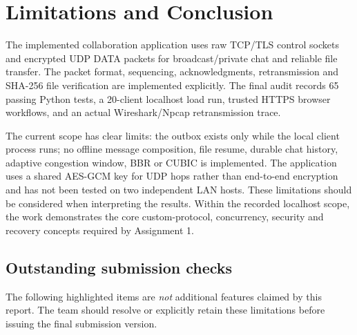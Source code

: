 \section{Limitations and Conclusion}

The implemented collaboration application uses raw TCP/TLS control sockets and encrypted UDP DATA packets for broadcast/private chat and reliable file transfer. The packet format, sequencing, acknowledgments, retransmission and SHA-256 file verification are implemented explicitly. The final audit records 65 passing Python tests, a 20-client localhost load run, trusted HTTPS browser workflows, and an actual Wireshark/Npcap retransmission trace.

The current scope has clear limits: the outbox exists only while the local client process runs; no offline message composition, file resume, durable chat history, adaptive congestion window, BBR or CUBIC is implemented. The application uses a shared AES-GCM key for UDP hops rather than end-to-end encryption and has not been tested on two independent LAN hosts. These limitations should be considered when interpreting the results. Within the recorded localhost scope, the work demonstrates the core custom-protocol, concurrency, security and recovery concepts required by Assignment 1.

\subsection{Outstanding submission checks}

The following highlighted items are \emph{not} additional features claimed by this report. The team should resolve or explicitly retain these limitations before issuing the final submission version.


